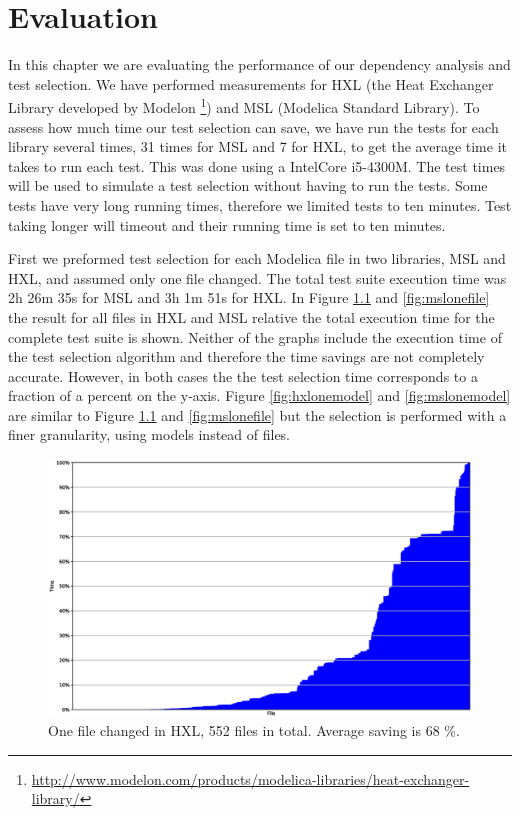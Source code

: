 \documentclass{cslthse-msc}
\begin{document}
\chapter[Evaluation]{Evaluation}
In this chapter we are evaluating the performance of our dependency analysis and test selection. We have performed measurements for HXL (the Heat Exchanger Library developed by Modelon \footnote{\url{http://www.modelon.com/products/modelica-libraries/heat-exchanger-library/}}) and MSL (Modelica Standard Library). To assess how much time our test selection can save, we have run the tests for each library several times, 31 times for MSL and 7 for HXL, to get the average time it takes to run each test. This was done using a Intel\textregistered Core \texttrademark i5-4300M. The test times will be used to simulate a test selection without having to run the tests. Some tests have very long running times, therefore we limited tests to ten minutes. Test taking longer will timeout and their running time is set to ten minutes.

First we preformed test selection for each Modelica file in two libraries, MSL and HXL, and assumed only one file changed. The total test suite execution time was 2h 26m 35s for MSL and 3h 1m 51s for HXL. In Figure \ref{fig:hxlonefile} and \ref{fig:mslonefile} the result for all files in HXL and MSL relative the total execution time for the complete test suite is shown. Neither of the graphs include the execution time of the test selection algorithm and therefore the time savings are not completely accurate. However, in both cases the the test selection time corresponds to a fraction of a percent on the y-axis. Figure \ref{fig:hxlonemodel} and \ref{fig:mslonemodel} are similar to Figure \ref{fig:hxlonefile} and \ref{fig:mslonefile} but the selection is performed with a finer granularity, using models instead of files. 

\begin{figure}[!htbp]
    \centering
    \includegraphics[width=\textwidth]{Graphs/HXL_one_file.eps}
    \caption{One file changed in HXL, 552 files in total. Average saving is 68 \%.}
    \label{fig:hxlonefile}
\end{figure}
\end{document}
